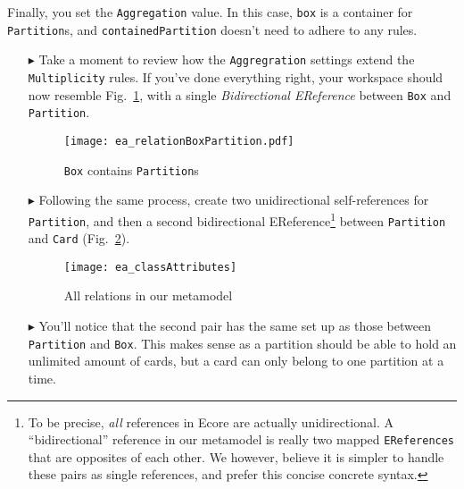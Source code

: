Finally, you set the \texttt{Aggregation} value. In this case, \texttt{box} is a
container for \texttt{Partition}s, and \texttt{containedPartition} doesn't need to adhere to any rules.

\begin{itemize}
\item[$\blacktriangleright$] Take a moment to review how the \texttt{Aggregration} settings extend the \texttt{Multiplicity} rules. If you've done everything
right, your workspace should now resemble Fig.~\ref{fig:ereference_completed}, with a single \emph{Bidirectional EReference} between \texttt{Box} and \texttt{Partition}.

\vspace{1cm}

\begin{figure}[htbp]
	\centering
  \texttt{[image: ea\_relationBoxPartition.pdf]}
	\caption{\texttt{Box} contains \texttt{Partition}s}
	\label{fig:ereference_completed}
\end{figure}
\FloatBarrier

\item[$\blacktriangleright$] Following the same process, create two unidirectional self-references for \texttt{Partition}, and then a second bidirectional
EReference\footnote{To be precise, \emph{all} references in Ecore are actually unidirectional. A ``bidirectional'' reference in our metamodel is really two
mapped \texttt{EReferences} that are opposites of each other. We however, believe it is simpler to handle these pairs as single references, and prefer this
concise concrete syntax.} between \texttt{Partition} and \texttt{Card} (Fig.~\ref{fig:ereferences_all}). 

\vspace{1cm}

\begin{figure}[htbp]
	\centering
  \texttt{[image: ea\_classAttributes]}
	\caption{All relations in our metamodel}
	\label{fig:ereferences_all}
\end{figure}
\FloatBarrier

\vspace{1cm}

\item[$\blacktriangleright$] You'll notice that the second pair has the same set up as those between \texttt{Partition} and \texttt{Box}. This makes sense as a
partition should be able to hold an unlimited amount of cards, but a card can only belong to one partition at a time.


\end{itemize}
